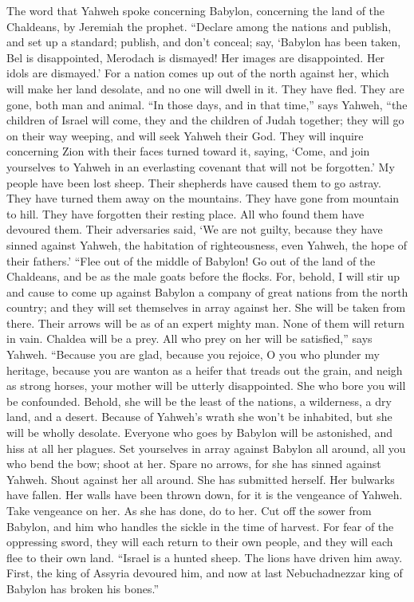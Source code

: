  The word that Yahweh spoke concerning Babylon, concerning
the land of the Chaldeans, by Jeremiah the prophet. 
``Declare among the nations and publish, and set up a standard; publish,
and don't conceal; say, `Babylon has been taken, Bel is disappointed,
Merodach is dismayed! Her images are disappointed. Her idols are
dismayed.'  For a nation comes up out of the north against
her, which will make her land desolate, and no one will dwell in it.
They have fled. They are gone, both man and animal.  ``In
those days, and in that time,'' says Yahweh, ``the children of Israel
will come, they and the children of Judah together; they will go on
their way weeping, and will seek Yahweh their God.  They
will inquire concerning Zion with their faces turned toward it, saying,
`Come, and join yourselves to Yahweh in an everlasting covenant that
will not be forgotten.'  My people have been lost sheep.
Their shepherds have caused them to go astray. They have turned them
away on the mountains. They have gone from mountain to hill. They have
forgotten their resting place.  All who found them have
devoured them. Their adversaries said, `We are not guilty, because they
have sinned against Yahweh, the habitation of righteousness, even
Yahweh, the hope of their fathers.'  ``Flee out of the
middle of Babylon! Go out of the land of the Chaldeans, and be as the
male goats before the flocks.  For, behold, I will stir up
and cause to come up against Babylon a company of great nations from the
north country; and they will set themselves in array against her. She
will be taken from there. Their arrows will be as of an expert mighty
man. None of them will return in vain.  Chaldea will be a
prey. All who prey on her will be satisfied,'' says Yahweh.
 ``Because you are glad, because you rejoice, O you who
plunder my heritage, because you are wanton as a heifer that treads out
the grain, and neigh as strong horses,  your mother will
be utterly disappointed. She who bore you will be confounded. Behold,
she will be the least of the nations, a wilderness, a dry land, and a
desert.  Because of Yahweh's wrath she won't be
inhabited, but she will be wholly desolate. Everyone who goes by Babylon
will be astonished, and hiss at all her plagues.  Set
yourselves in array against Babylon all around, all you who bend the
bow; shoot at her. Spare no arrows, for she has sinned against Yahweh.
 Shout against her all around. She has submitted herself.
Her bulwarks have fallen. Her walls have been thrown down, for it is the
vengeance of Yahweh. Take vengeance on her. As she has done, do to her.
 Cut off the sower from Babylon, and him who handles the
sickle in the time of harvest. For fear of the oppressing sword, they
will each return to their own people, and they will each flee to their
own land.  ``Israel is a hunted sheep. The lions have
driven him away. First, the king of Assyria devoured him, and now at
last Nebuchadnezzar king of Babylon has broken his bones.''

